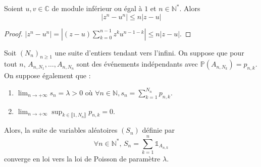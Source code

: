 






  \begin{lemma}
    \label{theoreme-des-evenements-rares-de-poisson-1}
    Soient $u, v \in \mathbb{C}$ de module inférieur ou égal à $1$ et $n \in \mathbb{N}^*$. Alors
    \[ |z^n - u^n| \leq n |z-u| \]
  \end{lemma}

  \begin{proof}
    $|z^n - u^n| = |(z-u) \sum_{k=0}^{n-1} z^k u^{n-1-k}| \leq n |z-u|$.
  \end{proof}


  \begin{theorem}
    Soit $(N_n)_{n \geq 1}$ une suite d'entiers tendant vers l'infini. On suppose que pour tout $n$, $A_{n,N_1}, \dots , A_{n,N_n}$ sont des événements indépendants avec $\mathbb{P}(A_{n,N_k}) = p_{n,k}$. On suppose également que :
    \begin{enumerate}[label=(\roman*)]
      \item $\lim_{n \rightarrow +\infty} s_n = \lambda > 0$ où $\forall n \in \mathbb{N}, s_n = \sum_{k=1}^{N_n} p_{n,k}$.
      \item $\lim_{n \rightarrow +\infty} \sup_{k \in \llbracket 1, N_n \rrbracket} p_{n,k} = 0$.
    \end{enumerate}
    Alors, la suite de variables aléatoires $(S_n)$ définie par
    \[ \forall n \in \mathbb{N}^*, \, S_n = \sum_{k=1}^n \mathbb{1}_{A_{n,k}} \]
    converge en loi vers la loi de Poisson de paramètre $\lambda$.
  \end{theorem}

